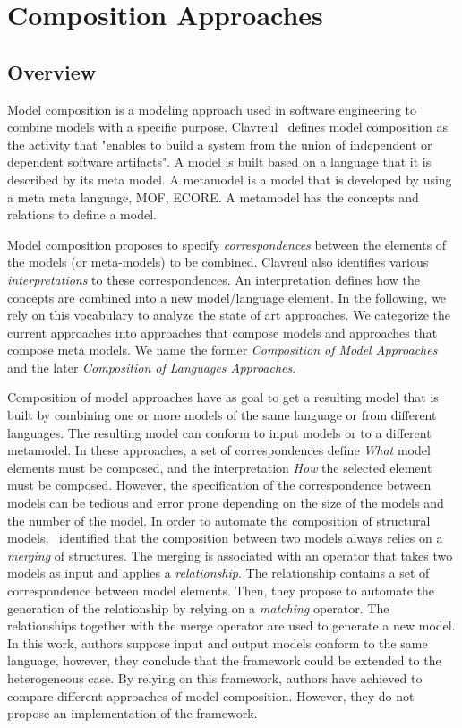 \section{Composition Approaches}
\subsection{Overview}
Model composition is a modeling approach used in software engineering to combine models with a specific purpose. Clavreul~\cite{clavreulmodelcompo} defines model composition as the activity that "enables to build a system from the union of independent or dependent software artifacts". A model is built based on a language that it is described by its meta model. A metamodel is a model that is developed by using a meta meta language, \eg MOF, ECORE. A metamodel has the concepts and relations to define a model.

Model composition proposes to specify \emph{correspondences} between the elements of the models (or meta-models) to be combined. Clavreul also identifies various \emph{interpretations} to these correspondences. An interpretation defines how the concepts are combined into a new model/language element. In the following, we rely on this vocabulary to analyze the state of art approaches. We categorize the current approaches into approaches that compose models and approaches that compose meta models. We name the former \emph{Composition of Model Approaches} and the later \emph{Composition of Languages Approaches}.    

Composition of model approaches have as goal to get a resulting model that is built by combining one or more models of the same language or from different languages. The resulting model can conform to input models or to a different metamodel. In these approaches, a set of correspondences define \emph{What} model elements must be composed, and the interpretation \emph{How} the selected element must be composed. However, the specification of the correspondence between models can be tedious and error prone depending on the size of the models and the number of the model. In order to automate the composition of structural models,~\cite{mergemanifest} identified that the composition between two models always relies on a \emph{merging} of structures. The merging is associated with an operator that takes two models as input and applies a \emph{relationship}. The relationship contains a set of correspondence between model elements. Then, they propose to automate the generation of the relationship by relying on a \emph{matching} operator. The relationships together with the merge operator are used to generate a new model. In this work, authors suppose input and output models conform to the same language, however, they conclude that the framework could be extended to the heterogeneous case. By relying on this framework, authors have achieved to compare different approaches of model composition. However, they do not propose an implementation of the framework. 

